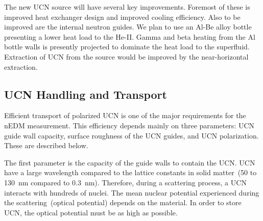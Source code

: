 The new UCN source will have several key improvements. Foremost of these
is improved heat exchanger design and improved cooling
efficiency. Also to be improved are the internal neutron guides. We
plan to use an Al-Be alloy bottle presenting a lower heat load to the
He-II. Gamma and beta heating from the Al bottle walls is presently
projected to dominate the heat load to the superfluid. Extraction of
UCN from the source would be improved by the near-horizontal
extraction.





\subsection{UCN Handling and Transport}

Efficient transport of polarized UCN is one of the major requirements
for the nEDM measurement. This efficiency depends mainly on three
parameters: UCN guide wall capacity, surface roughness of the UCN
guides, and UCN polarization. These are described below.

The first parameter is the capacity of the guide walls to contain the
UCN. UCN have a large wavelength compared to the lattice constants in
solid matter~(50 to 130~nm compared to 0.3~nm). Therefore, during a
scattering process, a UCN interacts with hundreds of nuclei. The mean
nuclear potential experienced during the scattering~(optical
potential) depends on the material. In order to store UCN, the optical
potential must be as high as possible.

